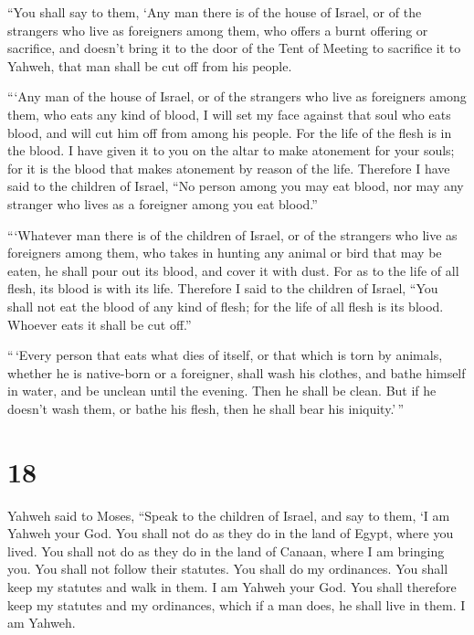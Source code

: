  ``You shall say to them, `Any man there is of the house of
Israel, or of the strangers who live as foreigners among them, who
offers a burnt offering or sacrifice,  and doesn't bring it
to the door of the Tent of Meeting to sacrifice it to Yahweh, that man
shall be cut off from his people.

 ```Any man of the house of Israel, or of the strangers who
live as foreigners among them, who eats any kind of blood, I will set my
face against that soul who eats blood, and will cut him off from among
his people.  For the life of the flesh is in the blood. I
have given it to you on the altar to make atonement for your souls; for
it is the blood that makes atonement by reason of the life.
 Therefore I have said to the children of Israel, ``No
person among you may eat blood, nor may any stranger who lives as a
foreigner among you eat blood.''

 ```Whatever man there is of the children of Israel, or of
the strangers who live as foreigners among them, who takes in hunting
any animal or bird that may be eaten, he shall pour out its blood, and
cover it with dust.  For as to the life of all flesh, its
blood is with its life. Therefore I said to the children of Israel,
``You shall not eat the blood of any kind of flesh; for the life of all
flesh is its blood. Whoever eats it shall be cut off.''

 ``\,`Every person that eats what dies of itself, or that
which is torn by animals, whether he is native-born or a foreigner,
shall wash his clothes, and bathe himself in water, and be unclean until
the evening. Then he shall be clean.  But if he doesn't
wash them, or bathe his flesh, then he shall bear his iniquity.'\,''

\hypertarget{section-17}{%
\section{18}\label{section-17}}

 Yahweh said to Moses,  ``Speak to the children
of Israel, and say to them, `I am Yahweh your God.  You
shall not do as they do in the land of Egypt, where you lived. You shall
not do as they do in the land of Canaan, where I am bringing you. You
shall not follow their statutes.  You shall do my
ordinances. You shall keep my statutes and walk in them. I am Yahweh
your God.  You shall therefore keep my statutes and my
ordinances, which if a man does, he shall live in them. I am Yahweh.

